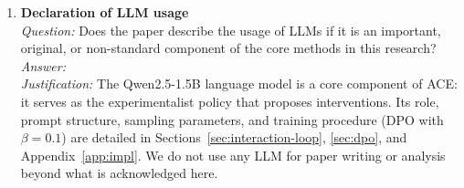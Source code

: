 \begin{enumerate}
\item \textbf{Declaration of LLM usage}\\
\emph{Question:} Does the paper describe the usage of LLMs if it is an important, original, or non-standard component of the core methods in this research?\\
\emph{Answer:} \answerYes{}\\
\emph{Justification:} The Qwen2.5-1.5B language model is a core component of ACE: it serves as the experimentalist policy that proposes interventions. Its role, prompt structure, sampling parameters, and training procedure (DPO with $\beta = 0.1$) are detailed in Sections~\ref{sec:interaction-loop}, \ref{sec:dpo}, and Appendix~\ref{app:impl}. We do not use any LLM for paper writing or analysis beyond what is acknowledged here.

\end{enumerate}
